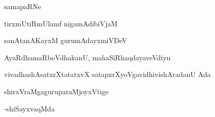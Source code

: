 \thispagestyle{empty}
\begin{center}
{\Large samapaRNe}
\end{center}

\begin{center}
tirxmUtiRmUlamf nigamAdibiVjaM 

sanAtanAKayxM gurumAdayxmiVDeV
\end{center}

\begin{center}
AyaRdhamaRboVdhakanU, mahaSiRhaqdayaveVdiyu

vivadhashAsatxrXtatatxvX  satapxrXyoVgavidhivishAradanU Ada 

shirxVraMgaguruparaMjoyxVtige 
\end{center}

\hfill {-shiSayxvaqMda}

